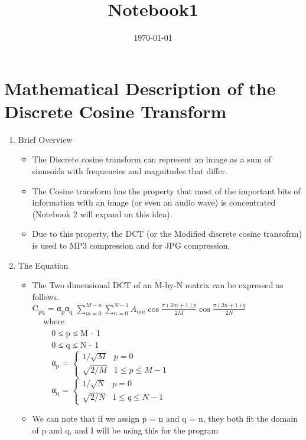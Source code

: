 \documentclass{article}
\date{\today}
\title{Notebook1}
\begin{document}
\maketitle
\tableofcontents

\section{Mathematical Description of the Discrete Cosine Transform}
\label{sec-1}
\begin{enumerate}
\item Brief Overview
\label{sec-1-1}
\begin{itemize}
\item The Discrete cosine transform can represent an image as a sum of
sinusoids with frequencies and magnitudes that differ.
\item The Cosine transform has the property that most of the important
bits of information with an image (or even an audio wave) is
concentrated (Notebook 2 will expand on this idea).
\item Due to this property, the DCT (or the Modified discrete cosine transofrm)
is used to MP3 compression and for JPG compression.
\end{itemize}
\item The Equation
\label{sec-1-2}
\begin{itemize}
\item The Two dimensional DCT of an M-by-N matrix can be expressed as
follows. \\
  C$_{\text{pq}}$ = α$_{\text{p}}$α$_{\text{q}}$ $\sum^{M-n}_{m = 0}\sum^{N-1}_{n = 0} A_{mn}\cos\frac{π(2m + 1)p}{2M}\cos\frac{π(2n + 1)q}{2N}$
\\ $\quad{}$ where
\\ $\quad{} \quad{}$ 0 ≤ p ≤ M - 1
\\ $\quad{} \quad{}$ 0 ≤ q ≤ N - 1
\\ $\quad{} \quad{}$ α$_{\text{p}}$ = $\begin{cases} 1/\sqrt{M} & p = 0 \\
                                            \sqrt{2/M} & 1 ≤ p ≤ M-1
                               \end{cases}$
\\ $\quad{} \quad{}$ α$_{\text{q}}$ = $\begin{cases} 1/\sqrt{N} & p = 0 \\
                                            \sqrt{2/N} & 1 ≤ q ≤ N-1
                               \end{cases}$
\item We can note that if we assign p = n and q = n, they both fit the domain of p and q, and I will be using this for the program
\end{itemize}
\end{enumerate}
\end{document}
